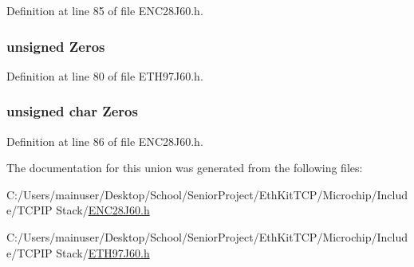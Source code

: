 Definition at line 85 of file E\+N\+C28\+J60.\+h.

\hypertarget{union_t_x_s_t_a_t_u_s_a5d7c894526240307bfa566861c38b467}{}
\subsubsection[{Zeros}]{\setlength{\rightskip}{0pt plus 5cm}unsigned Zeros}\label{union_t_x_s_t_a_t_u_s_a5d7c894526240307bfa566861c38b467}


Definition at line 80 of file E\+T\+H97\+J60.\+h.

\hypertarget{union_t_x_s_t_a_t_u_s_ad0452afc56466804510fcfaa94f11bda}{}
\subsubsection[{Zeros}]{\setlength{\rightskip}{0pt plus 5cm}unsigned char Zeros}\label{union_t_x_s_t_a_t_u_s_ad0452afc56466804510fcfaa94f11bda}


Definition at line 86 of file E\+N\+C28\+J60.\+h.



The documentation for this union was generated from the following files\+:\begin{DoxyCompactItemize}
\item 
C\+:/\+Users/mainuser/\+Desktop/\+School/\+Senior\+Project/\+Eth\+Kit\+T\+C\+P/\+Microchip/\+Include/\+T\+C\+P\+I\+P Stack/\hyperlink{_e_n_c28_j60_8h}{E\+N\+C28\+J60.\+h}\item 
C\+:/\+Users/mainuser/\+Desktop/\+School/\+Senior\+Project/\+Eth\+Kit\+T\+C\+P/\+Microchip/\+Include/\+T\+C\+P\+I\+P Stack/\hyperlink{_e_t_h97_j60_8h}{E\+T\+H97\+J60.\+h}\end{DoxyCompactItemize}
